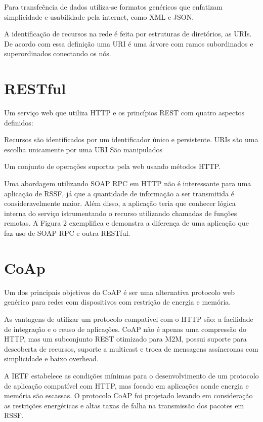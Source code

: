 Para transfe\^encia de dados utiliza-se formatos gen\'ericos que enfatizam simplicidade e usabilidade pela internet, como XML e JSON.

A identifica\c{c}\~ao de recursos na rede \'e feita por estruturas de diret\'orios, as URIs. De acordo com essa defini\c{c}\~ao uma URI \'e uma \'arvore com ramos subordinados e superordinados conectando os n\'os.

\section{RESTful}

Um servi\c{c}o web que utiliza HTTP e os princ\'ipios REST com quatro aspectos definidos:

Recursos s\~ao identificados por um identificador \'unico e persistente. URIs s\~ao uma escolha unicamente por uma URI
S\~ao manipulados 

Um conjunto de opera\c{c}\~oes suportas pela web usando m\'etodos HTTP.

Uma abordagem utilizando SOAP RPC em HTTP n\~ao \'e interessante para uma aplica\c{c}\~ao de RSSF, j\'a que a quantidade de informa\c{c}\~ao a ser transmitida \'e consideravelmente maior. Al\'em disso, a aplica\c{c}\~ao teria que conhecer l\'ogica interna do servi\c{c}o istrumentando o recurso utilizando chamadas de fun\c{c}\~oes remotas. A Figura 2 exemplifica e demonstra a diferen\c{c}a de uma aplica\c{c}\~ao que faz uso de SOAP RPC e outra RESTful.


\section{CoAp}

Um dos principais objetivos do CoAP \'e ser uma alternativa protocolo web gen\'erico para redes com dispositivos com restri\c{c}\~ao de energia e mem\'oria.

As vantagens de utilizar um protocolo compat\'ivel com o HTTP s\~ao: a facilidade de integra\c{c}\~ao e o reuso de aplica\c{c}\~oes. CoAP n\~ao \'e apenas uma compress\~ao do HTTP, mas um subconjunto REST otimizado para M2M, possui suporte para descoberta de recursos, suporte a multicast e troca de mensagens ass\'incronas com simplicidade e baixo overhead.

A IETF estabelece as condi\c{c}\~oes m\'inimas para o desenvolvimento de um protocolo de aplica\c{c}\~ao compat\'ivel com HTTP, mas focado em aplica\c{c}\~oes aonde energia e mem\'oria s\~ao escassas. O protocolo CoAP foi projetado levando em considera\c{c}\~ao as restri\c{c}\~oes energ\'eticas e altas taxas de falha na transmiss\~ao dos pacotes em RSSF.


